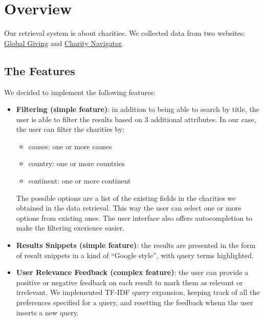 \documentclass[unicode,9pt,a4paper,oneside,numbers=endperiod,openany]{scrartcl}
\begin{document}
\setassignment
{}

\newline

\section{Overview}

Our retrieval system is about charities. We collected data from two websites: \href{https://www.globalgiving.org}{Global Giving} and \href{https://www.charitynavigator.org}{Charity Navigator}.

\subsection{The Features}

We decided to implement the following features:

\begin{itemize}
    \item \textbf{Filtering (simple feature)}: in addition to being able to search by title, the user is able to filter the results based on 3 additional attributes.
    In our case, the user can filter the charities by:
    \begin{itemize}
        \item causes: one or more causes
        \item country: one or more countries 
        \item continent: one or more continent
    \end{itemize}

    The possible options are a list of the existing fields in the charities we obtained in the data retrieval. This way the user can select one or more options from existing ones.
    The user interface also offers autocompletion to make the filtering exerience easier.
    
    \item \textbf{Results Snippets (simple feature)}: the results are presented in the form of result snippets in a
    kind of “Google style”, with query terms highlighted.
    \item \textbf{User Relevance Feedback (complex feature)}: the user can provide a positive or negative feedback on each result to mark them as relevant or irrelevant. We implemented TF-IDF query expansion, keeping track of all the preferences specified for a query, and resetting the feedback whenn the user inserts a new query.
\end{itemize}
\end{document}
